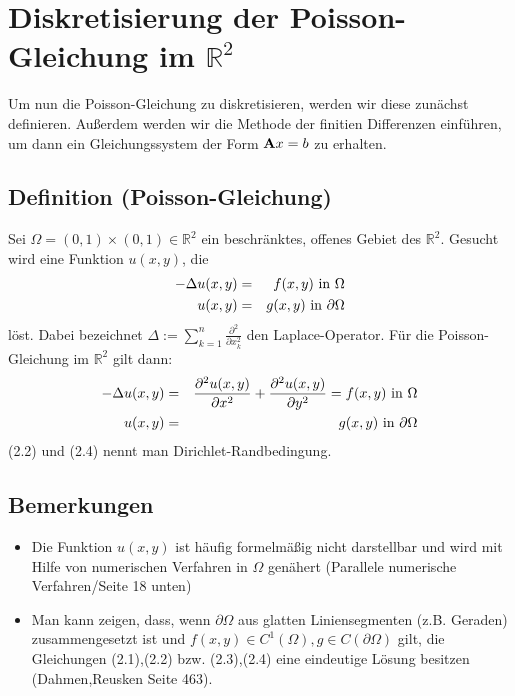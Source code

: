 \chapter{Diskretisierung der Poisson-Gleichung im $\mathbb{R}^{2}$}\label{c.Diskretisierte Poisson-Gleichung}
Um nun die Poisson-Gleichung zu diskretisieren, werden wir diese zunächst definieren. Außerdem werden wir die Methode der finitien Differenzen einführen, um dann ein Gleichungssystem der Form ${\textbf{A}}x = b$ zu erhalten.

\section{Definition (Poisson-Gleichung)}\label{s.Poisson-Gleichung}

Sei $\Omega = (0,1)\times(0,1) \in \mathbb{R}^{2}$ ein beschränktes, offenes Gebiet des $\mathbb{R}^{2}$. Gesucht wird eine Funktion $u(x,y)$, die
\begin{eqnarray}
	-\Delta u(x,y) &=& f(x,y) \textnormal{ in } \Omega \\
    u(x,y) &=& g(x,y) \textnormal{ in } \partial \Omega
\end{eqnarray}
löst.
Dabei bezeichnet $\Delta := \sum\limits_{k=1}^{n} \frac {\partial^{2}} {\partial x_{k}^{2}}$ den Laplace-Operator. Für die Poisson-Gleichung im $\mathbb{R}^{2}$ gilt dann:
\begin{eqnarray}
	-\Delta u(x,y) &=& \frac {\partial^{2} u(x,y)} {\partial x^{2}} + \frac {\partial^{2} u(x,y)} {\partial y^{2}} = f(x,y) \textnormal{ in } \Omega \\
    u(x,y) &=& g(x,y) \textnormal{ in } \partial \Omega
\end{eqnarray}
(2.2) und (2.4) nennt man Dirichlet-Randbedingung.

\section{Bemerkungen}\label{s.Bemerkungen zur Poisson-Gleichung}

\begin{itemize}
\item Die Funktion $u(x,y)$ ist häufig formelmäßig nicht darstellbar und wird mit Hilfe von numerischen Verfahren in $\Omega$ genähert (Parallele numerische Verfahren/Seite 18 unten)
\item Man kann zeigen, dass, wenn $\partial \Omega$ aus glatten Liniensegmenten (z.B. Geraden) zusammengesetzt ist und $f(x,y) \in C^{1}(\Omega), g \in C(\partial \Omega)$ gilt, die Gleichungen (2.1),(2.2) bzw. (2.3),(2.4) eine eindeutige Lösung besitzen (Dahmen,Reusken Seite 463).
\end{itemize}

